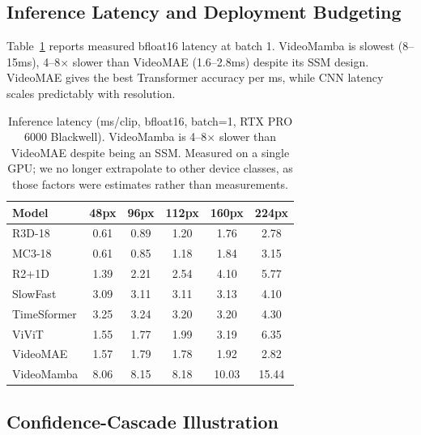 \documentclass[runningheads]{llncs}
\newcommand{\tabtight}{\setlength{\tabcolsep}{3.5pt}\renewcommand{\arraystretch}{1.10}}
\newcommand{\rev}[1]{\textcolor{revblue}{#1}}
\newcommand{\revdel}[1]{}
\begin{document}
\subsection{Inference Latency and Deployment Budgeting}
\label{sec:results_latency}

Table~\ref{tab:latency} reports measured bfloat16 latency at batch 1. VideoMamba is slowest (8--15ms), 4--8$\times$ slower than VideoMAE (1.6--2.8ms) despite its SSM design. VideoMAE gives the best Transformer accuracy per ms, while CNN latency scales predictably with resolution.

\begin{table}[t]
\centering
\caption{Inference latency (ms/clip, bfloat16, batch=1, RTX PRO 6000 Blackwell). VideoMamba is 4--8$\times$ slower than VideoMAE despite being an SSM. \revdel{Scale to other devices: RTX 4090 $\times$1.5, Jetson AGX Orin $\times$10, Jetson Nano $\times$50.} \rev{Measured on a single GPU; we no longer extrapolate to other device classes, as those factors were estimates rather than measurements.}}
\label{tab:latency}
\scriptsize\tabtight
\begin{tabular}{l ccccc}
\toprule
Model & 48px & 96px & 112px & 160px & 224px \\
\midrule
R3D-18      & 0.61 & 0.89 & 1.20 & 1.76 & 2.78 \\
MC3-18      & 0.61 & 0.85 & 1.18 & 1.84 & 3.15 \\
R2+1D       & 1.39 & 2.21 & 2.54 & 4.10 & 5.77 \\
SlowFast    & 3.09 & 3.11 & 3.11 & 3.13 & 4.10 \\
\midrule
TimeSformer & 3.25 & 3.24 & 3.20 & 3.20 & 4.30 \\
ViViT       & 1.55 & 1.77 & 1.99 & 3.19 & 6.35 \\
VideoMAE    & 1.57 & 1.79 & 1.78 & 1.92 & 2.82 \\
VideoMamba  & 8.06 & 8.15 & 8.18 & 10.03 & 15.44 \\
\bottomrule
\end{tabular}
\end{table}

\subsection{\rev{Confidence-Cascade Illustration}}
\label{sec:results_routing}
\end{document}
